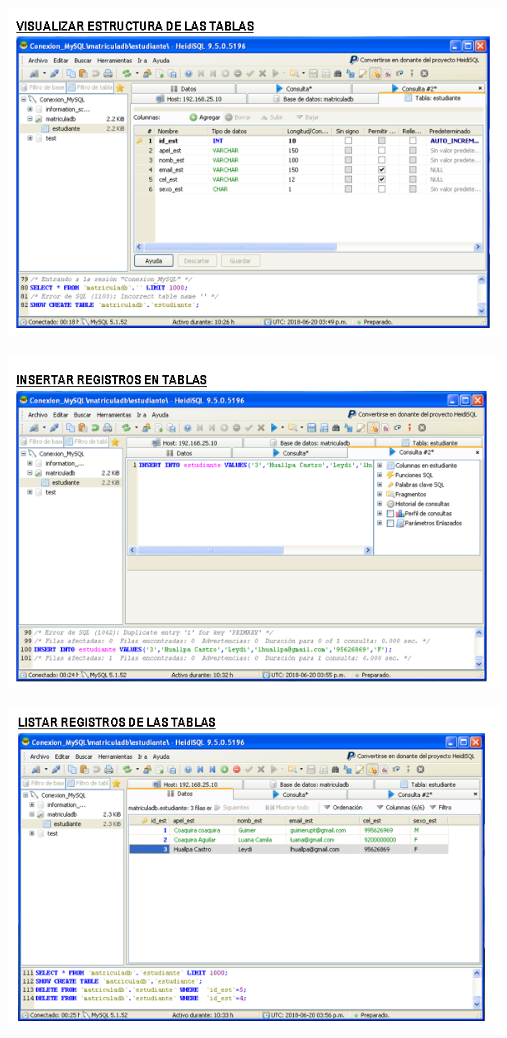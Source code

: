 \begin{itemize}
	\begin{center}
		\includegraphics[width=13cm]{./Imagenes/27a}
		\end{center}
\end{itemize} 

\begin{itemize}
	\begin{center}
		\includegraphics[width=13cm]{./Imagenes/28a}
		\end{center}
\end{itemize} 

\begin{itemize}
	\begin{center}
		\includegraphics[width=13cm]{./Imagenes/29a}
		\end{center}
\end{itemize} 

